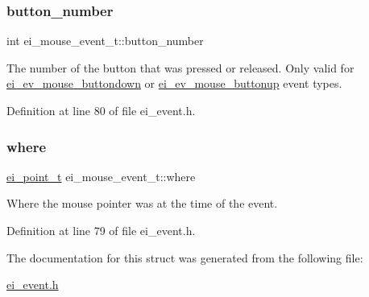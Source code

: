 \subsubsection{\texorpdfstring{button\+\_\+number}{button\_number}}
{\footnotesize\ttfamily int ei\+\_\+mouse\+\_\+event\+\_\+t\+::button\+\_\+number}



The number of the button that was pressed or released. Only valid for \hyperlink{ei__event_8h_a132dde064150d861ad24e9d839cbe007ae75b2b6a8423d54c46a418d222e0af66}{ei\+\_\+ev\+\_\+mouse\+\_\+buttondown} or \hyperlink{ei__event_8h_a132dde064150d861ad24e9d839cbe007aabd9931e36fb3628cc044a2aafc2c7e4}{ei\+\_\+ev\+\_\+mouse\+\_\+buttonup} event types. 



Definition at line 80 of file ei\+\_\+event.\+h.

\mbox{\label{structei__mouse__event__t_ac50f216f7af2a99469bd39cebc309af5}} 
\subsubsection{\texorpdfstring{where}{where}}
{\footnotesize\ttfamily \hyperlink{structei__point__t}{ei\+\_\+point\+\_\+t} ei\+\_\+mouse\+\_\+event\+\_\+t\+::where}



Where the mouse pointer was at the time of the event. 



Definition at line 79 of file ei\+\_\+event.\+h.



The documentation for this struct was generated from the following file\+:\begin{DoxyCompactItemize}
\item 
\hyperlink{ei__event_8h}{ei\+\_\+event.\+h}\end{DoxyCompactItemize}

